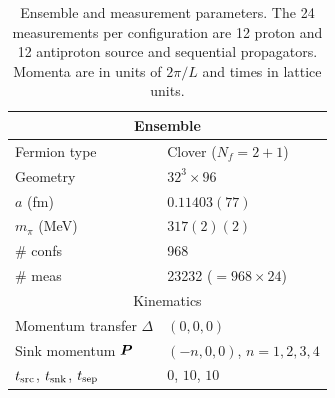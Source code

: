 \begin{table}[h!]
    \centering
    \renewcommand{\arraystretch}{1.3}
    \begin{tabular}{|l|l|}
    \hline
    \multicolumn{2}{|c|}{Ensemble} \\
    \hline
    Fermion type & Clover ($N_f=2+1$) \\
    \hline
    Geometry & $32^3\times96$ \\
    \hline
    $a$ (fm) & $0.11403(77)$ \\
    \hline
    $m_\pi$ (MeV) & $317(2)(2)$ \\
    \hline
    \# confs & 968 \\
    \hline
    \# meas & 23232 ($=968\times24$) \\
    \hline
    \multicolumn{2}{|c|}{Kinematics} \\
    \hline
    Momentum transfer $\Delta$ & $(0,0,0)$ \\
    \hline
    Sink momentum $\boldsymbol{P}$ & $(-n,0,0)$, $n=1,2,3,4$ \\
    \hline
    $t_{\rm src}$, $t_{\rm snk}$, $t_{\rm sep}$ & $0$, $10$, $10$ \\
    \hline
    \end{tabular}
    \caption{Ensemble and measurement parameters. The 24 measurements per configuration are 12 proton and 12 antiproton source and sequential propagators. Momenta are in units of $2\pi/L$ and times in lattice units.}
    \label{tab:lat_setup}
\end{table}
